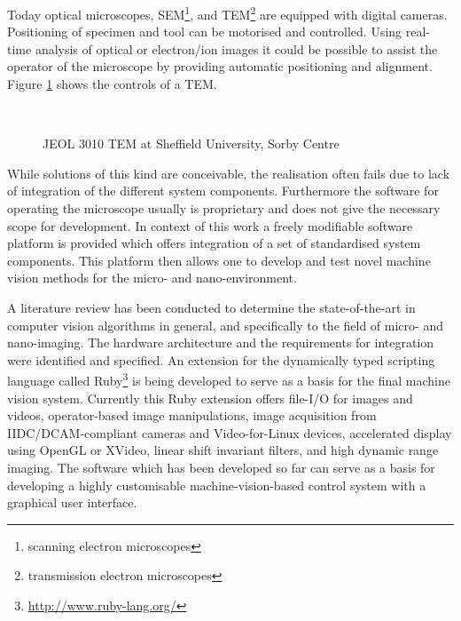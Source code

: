 \documentclass[a4paper,12pt]{book}
\begin{document}
Today optical microscopes, SEM\footnote{scanning electron microscopes}, and
TEM\footnote{transmission electron microscopes} are equipped with digital
cameras. Positioning of specimen and tool can be motorised
and controlled. Using real-time analysis of optical or electron/ion images
it could be possible to assist the operator of the microscope by providing
automatic positioning and alignment. Figure \ref{fig:jeol} shows the
controls of a TEM.
\begin{figure}[htbp]
   \begin{center}
     \\
     \caption{JEOL 3010 TEM at Sheffield University, Sorby Centre\label{fig:jeol}}
   \end{center}
\end{figure}
While solutions of this kind are conceivable, the realisation often fails due
to lack of integration of the different system components. Furthermore
the software for operating the microscope usually is proprietary and
does not give the necessary scope for development. In context of this work
a freely modifiable software platform is provided which offers integration
of a set of standardised system components. This platform then allows one to
develop and test novel machine vision methods for the micro- and
nano-environment.

A literature review has been conducted to determine the state-of-the-art in
computer vision algorithms in general, and specifically to the field of
micro- and nano-imaging. The hardware architecture and the requirements for
integration were identified and specified. An
extension for the dynamically typed scripting language called
Ruby\footnote{\url{http://www.ruby-lang.org/}} is being developed to
serve as a basis for the final machine vision system. %
Currently this
Ruby extension offers file-I/O for images and videos, operator-based image
manipulations, image acquisition from IIDC/DCAM-compliant cameras and
Video-for-Linux devices, accelerated display using OpenGL or XVideo,
linear shift invariant filters, and high dynamic range imaging. The software
which has been developed so far can serve as a basis for developing a highly
customisable machine-vision-based control system with a graphical user
interface.
\end{document}
